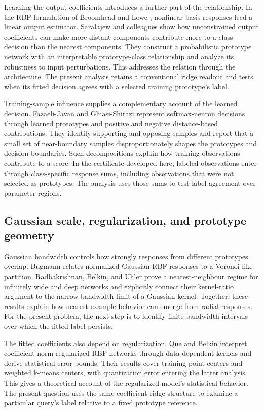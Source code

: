 \documentclass[preprint,12pt,authoryear]{elsarticle}
\begin{document}
Learning the output coefficients introduces a further part of the relationship. In the RBF formulation of Broomhead and Lowe \citeyearpar{broomhead1988}, nonlinear basis responses feed a linear output estimator. Saralajew and colleagues \citeyearpar{saralajew2025} show how unconstrained output coefficients can make more distant components contribute more to a class decision than the nearest components. They construct a probabilistic prototype network with an interpretable prototype-class relationship and analyze its robustness to input perturbations. This addresses the relation through the architecture. The present analysis retains a conventional ridge readout and tests when its fitted decision agrees with a selected training prototype's label.

Training-sample influence supplies a complementary account of the learned decision. Fazaeli-Javan and Ghiasi-Shirazi \citeyearpar{fazaeli2026} represent softmax-neuron decisions through learned prototypes and positive and negative distance-based contributions. They identify supporting and opposing samples and report that a small set of near-boundary samples disproportionately shapes the prototypes and decision boundaries. Such decompositions explain how training observations contribute to a score. In the certificate developed here, labeled observations enter through class-specific response sums, including observations that were not selected as prototypes. The analysis uses those sums to test label agreement over parameter regions.

\subsection{Gaussian scale, regularization, and prototype geometry}
Gaussian bandwidth controls how strongly responses from different prototypes overlap. Bugmann \citeyearpar{bugmann1998} relates normalized Gaussian RBF responses to a Voronoi-like partition. Radhakrishnan, Belkin, and Uhler \citeyearpar{radhakrishnan2023} prove a nearest-neighbour regime for infinitely wide and deep networks and explicitly connect their kernel-ratio argument to the narrow-bandwidth limit of a Gaussian kernel. Together, these results explain how nearest-example behavior can emerge from radial responses. For the present problem, the next step is to identify finite bandwidth intervals over which the fitted label persists.

The fitted coefficients also depend on regularization. Que and Belkin \citeyearpar{que2016} interpret coefficient-norm-regularized RBF networks through data-dependent kernels and derive statistical error bounds. Their results cover training-point centers and weighted k-means centers, with quantization error entering the latter analysis. This gives a theoretical account of the regularized model's statistical behavior. The present question uses the same coefficient-ridge structure to examine a particular query's label relative to a fixed prototype reference.
\end{document}
